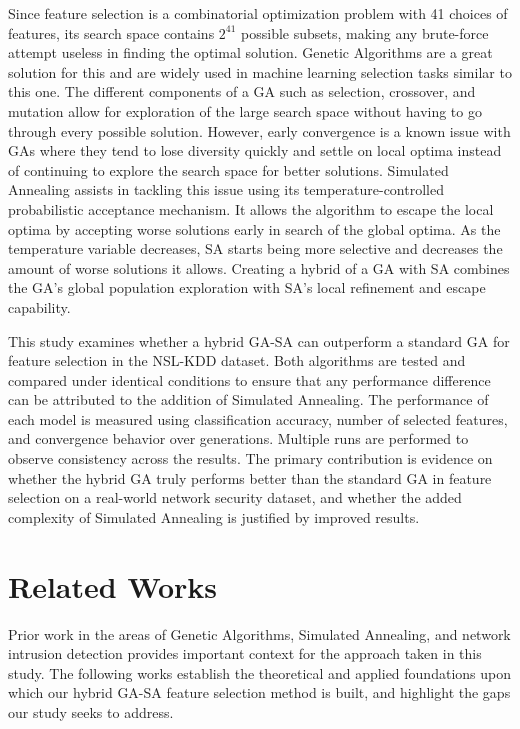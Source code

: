 \documentclass[letterpaper]{article} %
\begin{document}
Since feature selection is a combinatorial optimization problem with 41 choices of features, its search space contains $2^{41}$ possible subsets, making any brute-force attempt useless in finding the optimal solution. Genetic Algorithms are a great solution for this and are widely used in machine learning selection tasks similar to this one. The different components of a GA such as selection, crossover, and mutation allow for exploration of the large search space without having to go through every possible solution. However, early convergence is a known issue with GAs where they tend to lose diversity quickly and settle on local optima instead of continuing to explore the search space for better solutions. Simulated Annealing assists in tackling this issue using its temperature-controlled probabilistic acceptance mechanism. It allows the algorithm to escape the local optima by accepting worse solutions early in search of the global optima. As the temperature variable decreases, SA starts being more selective and decreases the amount of worse solutions it allows. Creating a hybrid of a GA with SA combines the GA's global population exploration with SA's local refinement and escape capability.

This study examines whether a hybrid GA-SA can outperform a standard GA for feature selection in the NSL-KDD dataset. Both algorithms are tested and compared under identical conditions to ensure that any performance difference can be attributed to the addition of Simulated Annealing. The performance of each model is measured using classification accuracy, number of selected features, and convergence behavior over generations. Multiple runs are performed to observe consistency across the results. The primary contribution is evidence on whether the hybrid GA truly performs better than the standard GA in feature selection on a real-world network security dataset, and whether the added complexity of Simulated Annealing is justified by improved results.

\section{Related Works}

Prior work in the areas of Genetic Algorithms, Simulated Annealing, and network intrusion detection provides important context for the approach taken in this study. The following works establish the theoretical and applied foundations upon which our hybrid GA-SA feature selection method is built, and highlight the gaps our study seeks to address.
\end{document}
